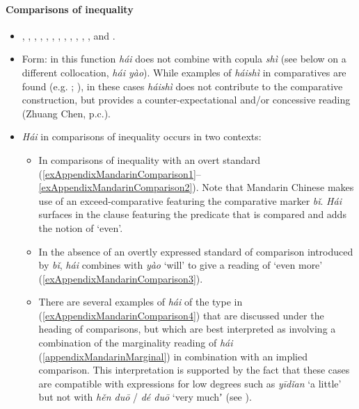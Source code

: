 \paragraph{Comparisons of inequality}\label{appendixMandarinComparisons}
\begin{itemize}
	\item \textcite[ch. 2.3]{Alleton1972}, \textcite{Chen2018}, \textcite[193–206]{Donazzan2008}, \textcite{JingSchmidtGries2009}, \textcite{Liu2000}, \textcite{Lu2019}, \textcite{Paris1988}, \textcite{ParisShi2016}, \textcite[187, 335]{Wiedenhof2015}, \textcite{Yang2017}, \textcite{Yeh1998}, \textcite{Zhang2017}, and \textcite{ZhangLing2016}.
	\item Form: in this function \textit{hái} does not combine with copula \textit{shì} (see below on a different collocation, \textit{hái yào}). While examples of \textit{háishì} in comparatives are found (e.g. \cite[326]{BiqHuang2016}; \cite[335]{Wiedenhof2015}), in these cases \textit{háishì} does not contribute to the comparative construction, but provides a counter-expectational and/or concessive reading (Zhuang Chen, p.c.).
	\item \textit{Hái} in comparisons of inequality occurs in two contexts:
	\begin{itemize}
		\item In comparisons of inequality with an overt standard (\ref{exAppendixMandarinComparison1}–\ref{exAppendixMandarinComparison2}). Note that Mandarin Chinese makes use of an exceed-comparative \parencite{Stassen2013} featuring the comparative marker \textit{bǐ}. \textit{Hái} surfaces in the clause featuring the predicate that is compared and adds the notion of \lq even\rq{}.
		\item In the absence of an overtly expressed standard of comparison introduced by \textit{bǐ}, \textit{hái} combines with \textit{yào} \lq will' to give a reading of \lq even more' (\ref{exAppendixMandarinComparison3}).
		\item There are several examples of \textit{hái} of the type in (\ref{exAppendixMandarinComparison4}) that are discussed under the heading of comparisons, but which are best interpreted as involving a combination of the marginality reading of \textit{hái} (\ref{appendixMandarinMarginal}) in combination with an implied comparison. This interpretation is supported by the fact that these cases are compatible with expressions for low degrees such as \textit{yīdǐan} \lq a little' but not with \textit{hěn duō} / \textit{dé duō} \lq very muchʼ (see \cite[66]{Liu2000}).
	\end{itemize}
\end{itemize}
